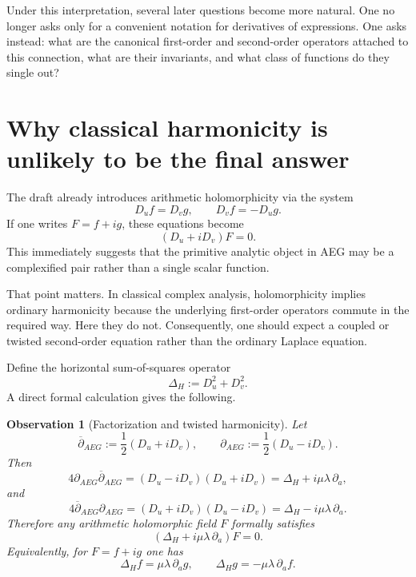 \documentclass[11pt]{article}
\newtheorem{observation}{Observation}[section]
\newcommand{\AEG}{AEG}
\newcommand{\delbar}{\overline{\partial}_{\!\AEG}}
\newcommand{\delAEG}{\partial_{\!\AEG}}
\begin{document}
Under this interpretation, several later questions become more natural. One no longer asks only for a convenient notation for derivatives of expressions. One asks instead: what are the canonical first-order and second-order operators attached to this connection, what are their invariants, and what class of functions do they single out?

\section{Why classical harmonicity is unlikely to be the final answer}

The draft already introduces arithmetic holomorphicity via the system
\begin{equation}
D_u f = D_v g,
\qquad
D_v f = -D_u g.
\end{equation}
If one writes $F=f+ig$, these equations become
\begin{equation}
(D_u + iD_v)F = 0.
\end{equation}
This immediately suggests that the primitive analytic object in \AEG{} may be a complexified pair rather than a single scalar function.

That point matters. In classical complex analysis, holomorphicity implies ordinary harmonicity because the underlying first-order operators commute in the required way. Here they do not. Consequently, one should expect a coupled or twisted second-order equation rather than the ordinary Laplace equation.

Define the horizontal sum-of-squares operator
\begin{equation}
\Delta_H := D_u^2 + D_v^2.
\end{equation}
A direct formal calculation gives the following.

\begin{observation}[Factorization and twisted harmonicity]
Let
\begin{equation}
\delbar := \frac{1}{2}(D_u + iD_v),
\qquad
\delAEG := \frac{1}{2}(D_u - iD_v).
\end{equation}
Then
\begin{equation}
4\delAEG\delbar
= (D_u - iD_v)(D_u + iD_v)
= \Delta_H + i\mu\lambda\,\partial_a,
\end{equation}
and
\begin{equation}
4\delbar\delAEG
= (D_u + iD_v)(D_u - iD_v)
= \Delta_H - i\mu\lambda\,\partial_a.
\end{equation}
Therefore any arithmetic holomorphic field $F$ formally satisfies
\begin{equation}
(\Delta_H + i\mu\lambda\,\partial_a)F = 0.
\end{equation}
Equivalently, for $F=f+ig$ one has
\begin{equation}
\Delta_H f = \mu\lambda\,\partial_a g,
\qquad
\Delta_H g = -\mu\lambda\,\partial_a f.
\end{equation}
\end{observation}
\end{document}
